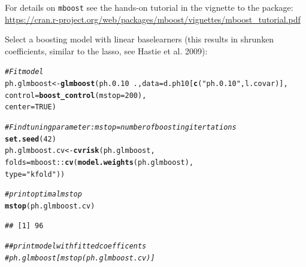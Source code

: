 \documentclass[11pt,a4paper,twoside]{article}\usepackage[]{graphicx}\usepackage[]{color}
\makeatletter
\newcommand{\hlnum}[1]{\textcolor[rgb]{0.686,0.059,0.569}{#1}}%
\newcommand{\hlstr}[1]{\textcolor[rgb]{0.192,0.494,0.8}{#1}}%
\newcommand{\hlcom}[1]{\textcolor[rgb]{0.678,0.584,0.686}{\textit{#1}}}%
\newcommand{\hlopt}[1]{\textcolor[rgb]{0,0,0}{#1}}%
\newcommand{\hlstd}[1]{\textcolor[rgb]{0.345,0.345,0.345}{#1}}%
\newcommand{\hlkwb}[1]{\textcolor[rgb]{0.69,0.353,0.396}{#1}}%
\newcommand{\hlkwc}[1]{\textcolor[rgb]{0.333,0.667,0.333}{#1}}%
\newcommand{\hlkwd}[1]{\textcolor[rgb]{0.737,0.353,0.396}{\textbf{#1}}}%
\newenvironment{kframe}{%
 \def\at@end@of@kframe{}%
 \ifinner\ifhmode%
  \def\at@end@of@kframe{\end{minipage}}%
  \begin{minipage}{\columnwidth}%
 \fi\fi%
 \def\FrameCommand##1{\hskip\@totalleftmargin \hskip-\fboxsep
 \colorbox{shadecolor}{##1}\hskip-\fboxsep
     \hskip-\linewidth \hskip-\@totalleftmargin \hskip\columnwidth}%
 \MakeFramed {\advance\hsize-\width
   \@totalleftmargin\z@ \linewidth\hsize
   \@setminipage}}%
 {\par\unskip\endMakeFramed%
 \at@end@of@kframe}
\newenvironment{knitrout}{}{} %
\makeatother
\begin{document}
For details on \texttt{mboost} see the hands-on tutorial in the vignette to the package:
\url{https://cran.r-project.org/web/packages/mboost/vignettes/mboost_tutorial.pdf}

Select a boosting model with linear baselearners (this results in shrunken coefficients, similar to the lasso, see Hastie et al. 2009): 

\begin{knitrout}
\color{fgcolor}\begin{kframe}
\begin{alltt}
\hlcom{# Fit model}
\hlstd{ph.glmboost} \hlkwb{<-} \hlkwd{glmboost}\hlstd{(ph.0.10} \hlopt{~}\hlstd{.,} \hlkwc{data} \hlstd{= d.ph10[} \hlkwd{c}\hlstd{(}\hlstr{"ph.0.10"}\hlstd{, l.covar)],}
                        \hlkwc{control} \hlstd{=} \hlkwd{boost_control}\hlstd{(}\hlkwc{mstop} \hlstd{=} \hlnum{200}\hlstd{),}
                        \hlkwc{center} \hlstd{=} \hlnum{TRUE}\hlstd{)}

\hlcom{# Find tuning parameter: mstop = number of boosting itertations}
\hlkwd{set.seed}\hlstd{(}\hlnum{42}\hlstd{)}
\hlstd{ph.glmboost.cv} \hlkwb{<-} \hlkwd{cvrisk}\hlstd{(ph.glmboost,}
                         \hlkwc{folds} \hlstd{= mboost}\hlopt{::}\hlkwd{cv}\hlstd{(}\hlkwd{model.weights}\hlstd{(ph.glmboost),}
                                            \hlkwc{type} \hlstd{=} \hlstr{"kfold"}\hlstd{))}

\hlcom{# print optimal mstop}
\hlkwd{mstop}\hlstd{(ph.glmboost.cv)}
\end{alltt}
\begin{verbatim}
## [1] 96
\end{verbatim}
\begin{alltt}
\hlcom{## print model with fitted coefficents }
\hlcom{# ph.glmboost[ mstop(ph.glmboost.cv)]}
\end{alltt}
\end{kframe}
\end{knitrout}
\end{document}
